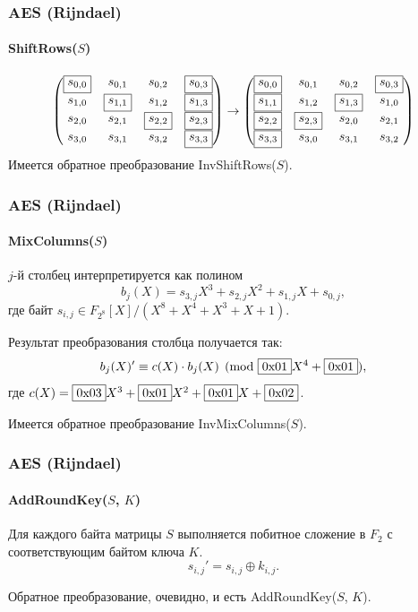 \begin{frame}
    \frametitle{AES (Rijndael)}
    \framesubtitle{ShiftRows($S$)}
    
    \[
        \begin{pmatrix}
            \fbox{$s_{0,0}$}    & s_{0,1}           & s_{0,2}           &  \fbox{$s_{0,3}$} \\ 
            s_{1,0}             & \fbox{$s_{1,1}$}  & s_{1,2}           &  \fbox{$s_{1,3}$} \\ 
            s_{2,0}             & s_{2,1}           & \fbox{$s_{2,2}$}  &  \fbox{$s_{2,3}$} \\ 
            s_{3,0}             & s_{3,1}           & s_{3,2}           &  \fbox{$s_{3,3}$}
        \end{pmatrix}
        \to
        \begin{pmatrix}
            \fbox{$s_{0,0}$}    & s_{0,1}           & s_{0,2}           &  \fbox{$s_{0,3}$} \\ 
            \fbox{$s_{1,1}$}    & s_{1,2}           &  \fbox{$s_{1,3}$} & s_{1,0}\\ 
            \fbox{$s_{2,2}$}    &  \fbox{$s_{2,3}$} & s_{2,0}           & s_{2,1}\\ 
            \fbox{$s_{3,3}$}    & s_{3,0}           & s_{3,1}           & s_{3,2}
        \end{pmatrix}
    \]
    Имеется обратное преобразование InvShiftRows($S$).
\end{frame}


\begin{frame}
    \frametitle{AES (Rijndael)}
    \framesubtitle{MixColumns($S$)}
    
    $j$-й столбец интерпретируется как полином 
    \[
        b_j(X) = s_{3,j}X^3 + s_{2,j}X^2 + s_{1,j}X + s_{0,j},
    \]
    где байт $s_{i,j}\in F_{2^8}[X]/(X^8+X^4+X^3+X+1)$.
    
    Результат преобразования столбца получается так:
    \[
        b_j(X)'\equiv c(X)\cdot b_j(X)\pmod{\fbox{0x01}X^4+\fbox{0x01}},
    \]
    где $c(X)=\fbox{0x03}X^3 + \fbox{0x01}X^2 + \fbox{0x01}X + \fbox{0x02}$.
    
    Имеется обратное преобразование InvMixColumns($S$).
\end{frame}


\begin{frame}
    \frametitle{AES (Rijndael)}
    \framesubtitle{AddRoundKey($S$, $K$)}

    Для каждого байта матрицы $S$ выполняется побитное сложение в $F_2$ с соответствующим байтом ключа $K$.
    \[s_{i,j}'=s_{i,j}\oplus k_{i,j}.\]
    
    Обратное преобразование, очевидно, и есть AddRoundKey($S$, $K$).
\end{frame}


